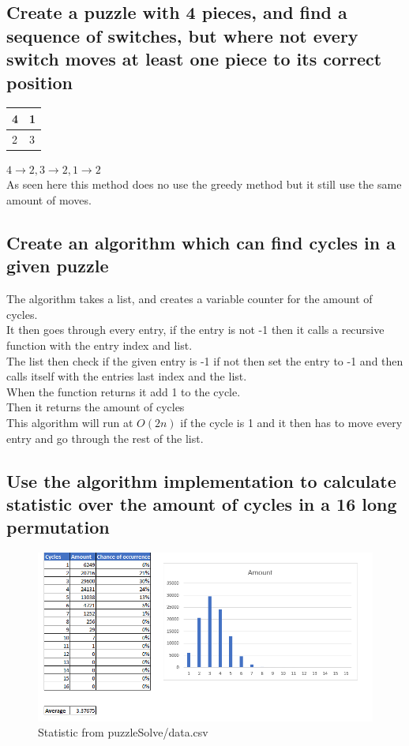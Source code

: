 \documentclass[12pt, a4paper]{article}
\begin{document}
			\subsection{Create a puzzle with 4 pieces, and find a sequence of switches, but where not every switch moves at least one piece to its correct position}
				\begin{table}[h!]
					\begin{tabular}{|l|l|}
					\hline
					4&1\\\hline
					2&3\\\hline
					\end{tabular}
				\end{table}	
				$4\rightarrow 2,3\rightarrow 2, 1\rightarrow 2$\\
				As seen here this method does no use the greedy method but it still use the same amount of moves.
			\subsection{Create an algorithm which can find cycles in a given puzzle}
				The algorithm takes a list, and creates a variable counter for the amount of cycles.\\
				It then goes through every entry, if the entry is not -1 then it calls a recursive function with the entry index and list.\\
				The list then check if the given entry is -1 if not then set the entry to -1 and then calls itself with the entries last index and the list.\\
				When the function returns it add 1 to the cycle.\\
				Then it returns the amount of cycles\\
				This algorithm will run at $O(2n)$ if the cycle is 1 and it then has to move every entry and go through the rest of the list. 
			\subsection{Use the algorithm implementation to calculate statistic over the amount of cycles in a 16 long permutation}
				\begin{figure}[h!]
					\includegraphics[width=\linewidth]{assets/week5Exercise2.png}
					\caption{Statistic from puzzleSolve/data.csv}
				\end{figure}
\end{document}
